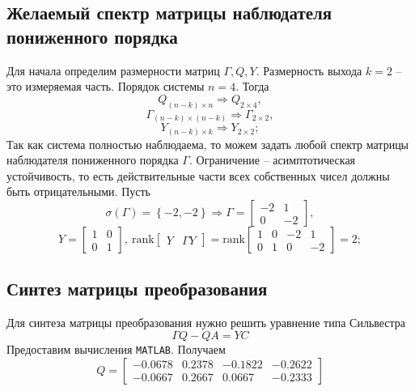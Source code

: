 \documentclass[a4paper, 12pt]{article}
\begin{document}
    \subsection{Желаемый спектр матрицы наблюдателя пониженного порядка}
    Для начала определим размерности матриц $\Gamma,Q,Y$. Размерность выхода $k=2$
    -- это измеряемая часть. Порядок системы $n=4$. Тогда
    $$Q_{\left(n-k\right)\times n}\Rightarrow Q_{2\times4},$$
    $$\Gamma_{\left(n-k\right)\times\left(n-k\right)}\Rightarrow\Gamma_{2\times2},$$
    $$Y_{\left(n-k\right)\times k}\Rightarrow Y_{2\times2};$$
    Так как система полностью наблюдаема, то можем задать любой спектр матрицы
    наблюдателя пониженного порядка $\Gamma$. Ограничение -- асимптотическая устойчивость,
    то есть действительные части всех собственных чисел должны быть отрицательными. Пусть
    $$\sigma\left(\Gamma\right)=\left\{-2,-2\right\}\Rightarrow\Gamma=\begin{bmatrix}
        -2 &1\\
        0 &-2
    \end{bmatrix},$$
    $$
    Y=\begin{bmatrix}
        1 &0\\
        0 &1
    \end{bmatrix},\ \text{rank}\begin{bmatrix}
        Y &\Gamma Y
    \end{bmatrix}=\text{rank}\begin{bmatrix}
        1     &0    &-2     &1\\
     0     &1     &0    &-2
    \end{bmatrix}=2;
    $$


    \subsection{Синтез матрицы преобразования}
    Для синтеза матрицы преобразования нужно решить уравнение типа Сильвестра
    $$
    \Gamma Q-QA=YC
    $$
    Предоставим вычисления \texttt{MATLAB}. Получаем
    $$
    Q=\begin{bmatrix}
    -0.0678    &0.2378   &-0.1822   &-0.2622\\
   -0.0667    &0.2667    &0.0667   &-0.2333
    \end{bmatrix}
    $$
\end{document}
